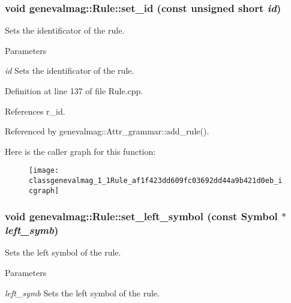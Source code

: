 \hypertarget{classgenevalmag_1_1Rule_af1f423dd609fc03692dd44a9b421d0eb}{
\subsubsection[{set\_\-id}]{\setlength{\rightskip}{0pt plus 5cm}void genevalmag::Rule::set\_\-id (const unsigned short {\em id})}}
\label{classgenevalmag_1_1Rule_af1f423dd609fc03692dd44a9b421d0eb}
Sets the identificator of the rule. 
\begin{DoxyParams}{Parameters}
\item[{\em id}]Sets the identificator of the rule. \end{DoxyParams}


Definition at line 137 of file Rule.cpp.



References r\_\-id.



Referenced by genevalmag::Attr\_\-grammar::add\_\-rule().



Here is the caller graph for this function:\nopagebreak
\begin{figure}[H]
\begin{center}
\leavevmode
\texttt{[image: classgenevalmag\_1\_1Rule\_af1f423dd609fc03692dd44a9b421d0eb\_icgraph]}
\end{center}
\end{figure}


\hypertarget{classgenevalmag_1_1Rule_aadb73aec92b549b69e2a46c5d0fb0c02}{
\subsubsection[{set\_\-left\_\-symbol}]{\setlength{\rightskip}{0pt plus 5cm}void genevalmag::Rule::set\_\-left\_\-symbol (const {\bf Symbol} $\ast$ {\em left\_\-symb})}}
\label{classgenevalmag_1_1Rule_aadb73aec92b549b69e2a46c5d0fb0c02}
Sets the left symbol of the rule. 
\begin{DoxyParams}{Parameters}
\item[{\em left\_\-symb}]Sets the left symbol of the rule. \end{DoxyParams}


